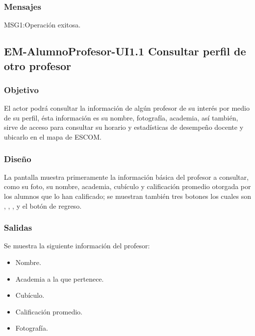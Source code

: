 \subsubsection{Mensajes}
\begin{Citemize}
	\item MSG1:Operación exitosa.
\end{Citemize}

\subsection{EM-AlumnoProfesor-UI1.1 Consultar perfil de otro profesor}

\subsubsection{Objetivo}
	\noindent
	El actor podrá consultar la información de algún profesor de su interés por medio de su perfil, ésta información es su nombre, fotografía, academia, así también, sirve de acceso para consultar su horario y estadísticas de desempeño docente y ubicarlo en el mapa de ESCOM.


\subsubsection{Diseño}
	\noindent
	La pantalla muestra primeramente la información básica del profesor a consultar, como su foto, su nombre, academia, cubículo y calificación promedio otorgada por los alumnos que lo han calificado; se muestran también tres botones los cuales son , , ,  y el botón de regreso.


\subsubsection{Salidas}
	\noindent
	Se muestra la siguiente información del profesor:
	\begin{itemize}
		\item Nombre.
		\item Academia a la que pertenece.
		\item Cubículo.
		\item Calificación promedio.
		\item Fotografía. 
	\end{itemize}

